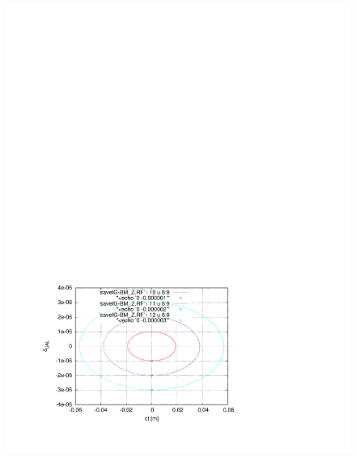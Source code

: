 \documentclass[]{article}
\begin{document}
\begin{figure}[h]
\begin{minipage}{\linewidth}
\includegraphics[scale=0.8]{pdf/LongitPhSp_BM_Z.pdf}
\end{minipage}
%
\begin{minipage}{\linewidth}
\centering

\end{minipage}
\end{figure}
\end{document}

